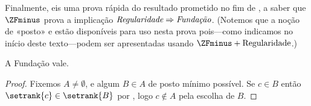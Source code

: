 \documentclass[../../../include/open-logic-section]{subfiles}
\begin{document}
Finalmente, eis uma prova rápida do resultado prometido no fim de
, a saber que $\ZFminus$ prova a implicação
$\emph{Regularidade} \Rightarrow \emph{Fundação}$. (Notemos que a
noção de «posto» e  estão disponíveis para uso
nesta prova pois---como indicamos no início deste texto---podem ser apresentadas usando $\ZFminus + \text{Regularidade}$.)

\begin{prop} A Fundação vale.
\end{prop}

\begin{proof}
Fixemos $A \neq \emptyset$, e algum $B \in A$ de posto mínimo possível. Se
$c \in B$ então $\setrank{c} \in \setrank{B}$ por
, logo $c \notin A$ pela escolha de $B$.
\end{proof}
\end{document}

